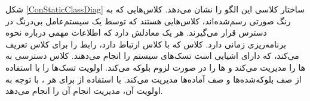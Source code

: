 \begin{RTL}
شکل \ref{ConStaticClassDiag} ساختار کلاسی این الگو را نشان می‌دهد.
کلاس‌هایی که به رنگ صورتی رسم‌شده‌اند، کلاس‌هایی هستند که توسط یک سیستم‌عامل
بی‌درنگ در دسترس قرار می‌گیرند. هر  یک
 معادلش دارد که اطلاعات مهمی درباره
نحوه برنامه‌ریزی زمانی دارد. کلاس  که با
کلاس  ارتباط دارد، رابط  را برای کلاس
 تعریف می‌کند، که دارای اشیایی است
تسک‌های سیستم را انجام می‌دهند. کلاس  دسترسی به
ها را مدیریت می‌کند و ها را
در صورت لزوم بلوکه می‌کند.  اولویت تسک‌ها را
با استفاده از صف بلوکه‌شده‌ها و صف آماده‌ها مدیریت می‌کند.
 با استفاده از
 برای هر ،
با توجه به اولویت آن، مدیریت انجام آن را انجام می‌دهد.
\end{RTL}